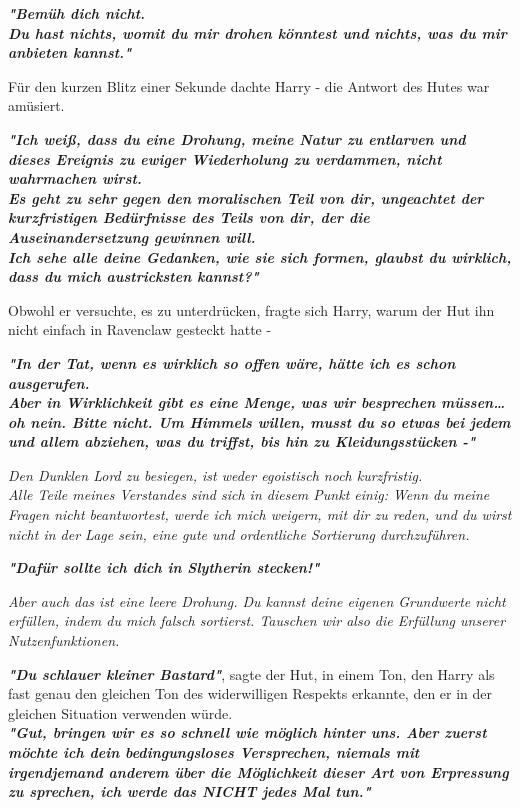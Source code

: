 {\textbf{\emph{"Bemüh dich nicht.\\ Du hast nichts, womit du mir drohen könntest und nichts, was du mir anbieten kannst."}}

Für den kurzen Blitz einer Sekunde dachte Harry - die Antwort des Hutes war amüsiert.

\textbf{\emph{"Ich weiß, dass du eine Drohung, meine Natur zu entlarven und dieses Ereignis zu ewiger Wiederholung zu verdammen, nicht wahrmachen wirst.\\ Es geht zu sehr gegen den moralischen Teil von dir, ungeachtet der kurzfristigen Bedürfnisse des Teils von dir, der die Auseinandersetzung gewinnen will.\\ Ich sehe alle deine Gedanken, wie sie sich formen, glaubst du wirklich, dass du mich austricksten kannst?"}}

Obwohl er versuchte, es zu unterdrücken, fragte sich Harry, warum der Hut ihn nicht einfach in Ravenclaw gesteckt hatte -

\textbf{\emph{"In der Tat, wenn es wirklich so offen wäre, hätte ich es schon ausgerufen.\\ Aber in Wirklichkeit gibt es eine Menge, was wir besprechen müssen… oh nein. Bitte nicht. Um Himmels willen, musst du so etwas bei jedem und allem abziehen, was du triffst, bis hin zu Kleidungsstücken -"}}

\emph{Den Dunklen Lord zu besiegen, ist weder egoistisch noch kurzfristig.\\ Alle Teile meines Verstandes sind sich in diesem Punkt einig: Wenn du meine Fragen nicht beantwortest, werde ich mich weigern, mit dir zu reden, und du wirst nicht in der Lage sein, eine gute und ordentliche Sortierung durchzuführen.}

\textbf{\emph{"Dafür sollte ich dich in Slytherin stecken!"}}

\emph{Aber auch das ist eine leere Drohung. Du kannst deine eigenen Grundwerte nicht erfüllen, indem du mich falsch sortierst. Tauschen wir also die Erfüllung unserer Nutzenfunktionen.}

\textbf{\emph{"Du schlauer kleiner Bastard"}}, sagte der Hut, in einem Ton, den Harry als fast genau den gleichen Ton des widerwilligen Respekts erkannte, den er in der gleichen Situation verwenden würde.\\ \textbf{\emph{\hfill\break "Gut, bringen wir es so schnell wie möglich hinter uns. Aber zuerst möchte ich dein bedingungsloses Versprechen, niemals mit irgendjemand anderem über die Möglichkeit dieser Art von Erpressung zu sprechen, ich werde das NICHT jedes Mal tun."}}

}

